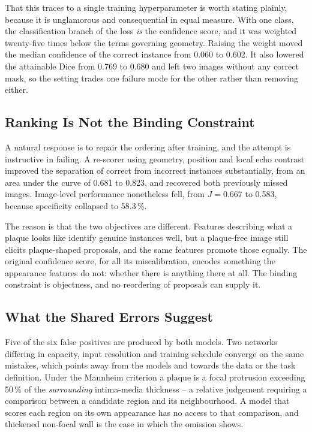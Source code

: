 That this traces to a single training hyperparameter is worth stating plainly, because it is
unglamorous and consequential in equal measure. With one class, the classification branch of the
loss \emph{is} the confidence score, and it was weighted twenty-five times below the terms
governing geometry. Raising the weight moved the median confidence of the correct instance from
0.060 to 0.602. It also lowered the attainable Dice from 0.769 to 0.680 and left two images
without any correct mask, so the setting trades one failure mode for the other rather than
removing either.

\subsection{Ranking Is Not the Binding Constraint}

A natural response is to repair the ordering after training, and the attempt is instructive in
failing. A re-scorer using geometry, position and local echo contrast improved the separation of
correct from incorrect instances substantially, from an area under the curve of 0.681 to 0.823,
and recovered both previously missed images. Image-level performance nonetheless fell, from
$J = 0.667$ to 0.583, because specificity collapsed to 58.3\,\%.

The reason is that the two objectives are different. Features describing what a plaque looks like
identify genuine instances well, but a plaque-free image still elicits plaque-shaped proposals,
and the same features promote those equally. The original confidence score, for all its
miscalibration, encodes something the appearance features do not: whether there is anything there
at all. The binding constraint is objectness, and no reordering of proposals can supply it.

\subsection{What the Shared Errors Suggest}
\label{sec:discussion-shared-errors}

Five of the six false positives are produced by both models. Two networks differing in capacity,
input resolution and training schedule converge on the same mistakes, which points away from the
models and towards the data or the task definition. Under the Mannheim criterion \cite{touboul2012mannheim} a plaque is a
focal protrusion exceeding 50\,\% of the \emph{surrounding} intima-media thickness -- a relative
judgement requiring a comparison between a candidate region and its neighbourhood. A model that
scores each region on its own appearance has no access to that comparison, and thickened
non-focal wall is the case in which the omission shows.

